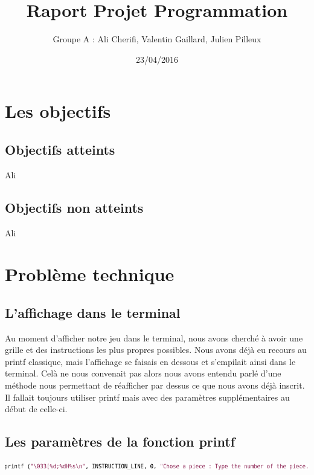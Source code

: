 \documentclass{article}
\title{Raport Projet Programmation}
\author{Groupe A : Ali Cherifi, Valentin Gaillard, Julien Pilleux}
\date{23/04/2016}
\begin{document}
\maketitle

\newpage

\section {Les objectifs}
\subsection {Objectifs atteints}
Ali
\subsection {Objectifs non atteints}
Ali

\section {Problème technique}
\subsection {L'affichage dans le terminal}
Au moment d'afficher notre jeu dans le terminal, nous avons cherché à avoir une grille et des instructions les plus propres possibles. Nous avons déjà eu recours au printf classique, mais l'affichage se faisais en dessous et s'empilait ainsi dans le terminal. Celà ne nous convenait pas alors nous avons entendu parlé d'une méthode nous permettant de réafficher par dessus ce que nous avons déjà inscrit. Il fallait toujours utiliser printf mais avec des paramètres supplémentaires au début de celle-ci.
\subsection {Les paramètres de la fonction printf}

\begin{flushleft}
\includegraphics[scale=0.45]{printf_capture.png}
\end{flushleft}
\end{document}

